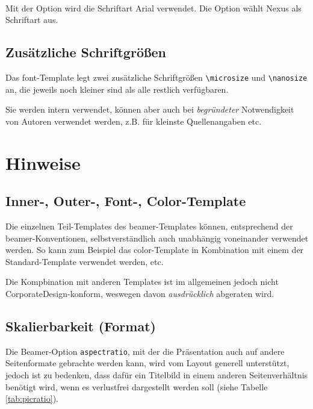\begin{Declaration}
  \\
\end{Declaration}

Mit der Option  wird die Schriftart Arial verwendet.
Die Option  wählt Nexus als Schriftart aus.

\subsection{Zusätzliche Schriftgrößen}

Das font-Template legt zwei zusätzliche Schriftgrößen \lstinline{\microsize}
und \lstinline{\nanosize} an, die jeweils noch kleiner sind als alle restlich
verfügbaren.

Sie werden intern verwendet, können aber auch bei \emph{begründeter}
Notwendigkeit von Autoren verwendet werden, z.B. für kleinste Quellenangaben
etc.


\section{Hinweise}

\subsection{Inner-, Outer-, Font-, Color-Template}

Die einzelnen Teil-Templates des beamer-Templates können,
entsprechend der beamer-Konventionen, selbstverständlich
auch unabhängig voneinander verwendet werden.
So kann zum Beispiel das color-Template in Kombination mit einem der
Standard-Template verwendet werden, etc.

Die Kompbination mit anderen Templates ist im allgemeinen jedoch nicht
CorporateDesign-konform, weswegen davon \emph{ausdrücklich} abgeraten wird.

\subsection{Skalierbarkeit (Format)}

Die Beamer-Option \lstinline{aspectratio}, mit der die Präsentation auch auf
andere Seitenformate gebrachte werden kann, wird vom Layout generell
unterstützt, jedoch ist zu bedenken, dass dafür ein Titelbild in einem anderen
Seitenverhältnis benötigt wird, wenn es verlustfrei dargestellt werden soll
(siehe Tabelle \ref{tab:picratio}).

